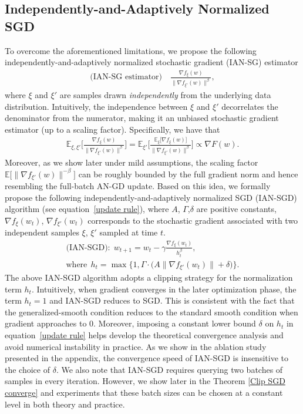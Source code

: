 \documentclass[10pt]{article} %
\def\eqref#1{equation~\ref{#1}}
\begin{document}
\subsection{Independently-and-Adaptively Normalized SGD}
To overcome the aforementioned limitations, 
we propose the following
independently-and-adaptively normalized stochastic gradient (IAN-SG) estimator 
\begin{align}
    \text{(IAN-SG estimator)} \quad \frac{\nabla f_{\xi}(w)}{\| \nabla f_{\xi'}(w) \|^{\beta}},
\end{align}
where $\xi$ and $\xi'$ are samples drawn {\em independently} from the underlying data distribution. Intuitively, the independence between $\xi$ and $\xi'$ decorrelates the denominator from the numerator, making it an unbiased stochastic gradient estimator (up to a scaling factor). Specifically, we have that
\begin{align}
    \mathbb{E}_{\xi, \xi'} \bigg[ \frac{\nabla f_{\xi}(w)}{ \| \nabla f_{\xi'}(w) \|^{\beta}} \bigg] =  \mathbb{E}_{\xi'} \bigg[ \frac{\mathbb{E}_{\xi} \big [\nabla f_{\xi}(w)\big]}{ \| \nabla f_{\xi'}(w)\|^{\beta}} \bigg] \propto  \nabla F(w).
\end{align}
Moreover, as we show later under mild assumptions, the scaling factor $\mathbb{E} \big[ \| \nabla f_{\xi'}(w)\|^{-\beta}\big]$ can be roughly bounded by the full gradient norm and hence resembling the full-batch AN-GD update.
Based on this idea, we formally propose the following independently-and-adaptively normalized SGD (IAN-SGD) algorithm (see \eqref{update rule}), where $A$, $\Gamma$,$\delta$ are positive constants, $\nabla f_{\xi}(w_t)$, $\nabla f_{\xi'}(w_t)$ corresponds to the stochastic gradient associated with two independent samples $\xi$, $\xi'$ sampled at time $t$.
\begin{align}
   \text{(IAN-SGD):} ~~ w_{t+1} = w_t - \gamma \frac{\nabla f_{\xi}(w_t)}{h_t^{\beta}}, ~~\nonumber\\
   \text{where} ~~ h_t = \max \Big\{1, \Gamma\cdot\Big({A\big \|\nabla f_{\xi'}(w_t)\big \|+ \delta}\Big) \Big \}\label{update rule}.
\end{align}
The above IAN-SGD algorithm adopts a clipping strategy for the normalization term $h_t$. Intuitively, when gradient converges in the later optimization phase, the term $h_t=1$ and IAN-SGD reduces to SGD. This is consistent with the fact that the generalized-smooth condition reduces to the standard smooth condition when gradient approaches to 0. Moreover, imposing a constant lower bound $\delta$ on $h_t$ in \eqref{update rule} helps develop the theoretical convergence analysis and avoid numerical instability in practice. As we show in the ablation study presented in the appendix, the convergence speed of IAN-SGD is insensitive to the choice of $\delta$.
We also note that IAN-SGD requires querying two batches of samples in every iteration. However, we show later in the Theorem \ref{Clip SGD converge} and experiments that these batch sizes can be chosen at a constant level in both theory and practice.
\end{document}
